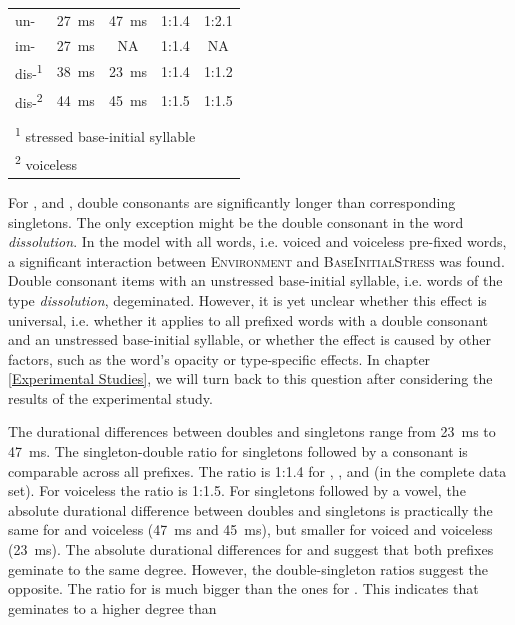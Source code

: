 \begin{table}[!t]
\begin{center}
{\begin{tabular} {lcccc}
			\midrule			
			un-& 27~ms & 47~ms   & 1:1.4 & 1:2.1\\ 
			im-&27~ms &NA  & 1:1.4 & NA\\ 
			dis-\textsuperscript{1}  &38~ms& 23~ms & 1:1.4& 1:1.2 \\
			dis-\textsuperscript{2} &44~ms& 45~ms &1:1.5& 1:1.5\\
			
			
			\midrule
			\\

			\multicolumn{5}{l}{\textsuperscript{1} \footnotesize{stressed base-initial syllable}}\\
			\multicolumn{5}{l}{\textsuperscript{2} \footnotesize{voiceless}}\\

		\end{tabular}
	}
	\end{center}
	

	
\end{table}


For ,  and , double consonants are significantly longer than corresponding singletons. The only exception might be the double consonant in the word \textit{dissolution}. In the model with all words, i.e. voiced and voiceless pre-fixed words, a significant interaction between \textsc{Environment} and \textsc{BaseInitialStress} was found. Double consonant items with an unstressed base-initial syllable, i.e. words of the type \textit{dissolution}, degeminated. However, it is yet unclear whether this effect is universal, i.e. whether it applies to all prefixed words with a double consonant and an unstressed base-initial syllable,  or whether the effect is caused by other factors, such as the word's opacity or type-specific effects. In chapter \ref{Experimental Studies}, we will turn back to this question after considering the results of the experimental study.

The durational differences between doubles and singletons range from 23~ms to 47~ms.  The singleton-double ratio for singletons followed by a consonant is comparable across all prefixes. The ratio is 1:1.4 for , , and  (in the complete data set). For voiceless  the ratio is 1:1.5.
For singletons followed by a vowel, the absolute durational difference between doubles and singletons is practically the same for  and voiceless  (47~ms and 45~ms), but smaller for voiced and voiceless  (23~ms). The absolute durational differences for  and  suggest that both prefixes geminate to the same degree. However, the double-singleton ratios suggest the opposite. The ratio for  is much bigger than the ones for . This indicates that  geminates to a higher degree than 


